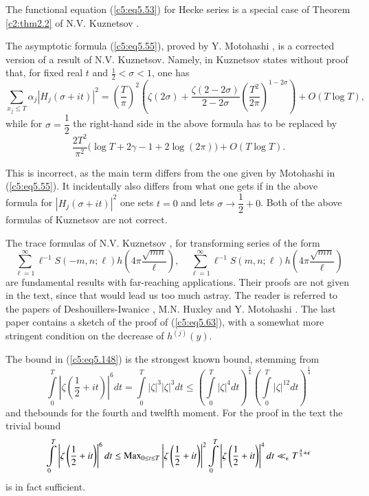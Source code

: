 The functional equation (\ref{c5:eq5.53}) for Hecke series is a
special case of Theorem \ref{c2:thm2.2} of N.V. Kuznetsov
\cite{Kuznetsov4}. 

The asymptotic formula (\ref{c5:eq5.55}), proved by Y. Motohashi
\cite{Motohashi7}, is a corrected version of a result of
N.V. Kuznetsov. Namely, in \cite{Kuznetsov4} Kuznetsov states without
proof that, for fixed real $t$ and $\frac{1}{2} < \sigma < 1$, one has 
$$ 
\sum\limits_{x_j \leq T} \alpha_j |H_j (\sigma + it)|^2 =
\left(\frac{T}{\pi} \right)^2 \left(\zeta(2\sigma) +
\frac{\zeta(2-2\sigma)}{2-2\sigma} \left(\frac{T^2}{2\pi}
\right)^{1-2\sigma}  \right) + O (T \log T), 
$$
while for $\sigma =\dfrac{1}{2}$ the right-hand side in the above
formula has to be replaced by 
$$
\frac{2T^2}{\pi^2} \big(\log T + 2 \gamma -1 + 2 \log (2\pi)\big) + O
(T \log T). 
$$

This is incorrect, as the main term differs from the one given by
Motohashi in (\ref{c5:eq5.55}). It incidentally also differs from what
one gets if in the above formula for $|H_j(\sigma + it)|^2$ one sets
$t =0$ and lets $\sigma \to \dfrac{1}{2} +0$. Both of the above
formulas of Kuznetsov are not correct. 

The trace formulas of N.V. Kuznetsov \cite{Kuznetsov2},
\cite{Kuznetsov3} for transforming series of the form  
$$
\sum\limits^\infty_{\ell=1} \ell^{-1} S (-m, n;\ell) h \left(4\pi
\frac{\sqrt{mn}}{\ell} \right),\quad \sum\limits^\infty_{\ell=1}
\ell^{-1} 
S (m,n;\ell) h  \left(4\pi\frac{\sqrt{mn}}{\ell} \right) 
$$
are fundamental results with far-reaching applications. Their proofs
are not given in the text, since that would lead us too much
astray. The reader is referred to the papers of Deshouillers-Iwanice
\cite{Deshouillers and Iwaniec1}, M.N. Huxley \cite{Huxley1} and
Y. Motohashi \cite{Motohashi6}. The last paper contains a sketch of
the proof of (\ref{c5:eq5.63}), with a somewhat more stringent
condition on the decrease of $h^{(j)} (y)$. 

The bound in (\ref{c5:eq5.148}) is the strongest known bound, stemming
from 
$$ 
\int\limits^T_0 \left|\zeta \left(\frac{1}{2} + it \right)\right|^6 dt
= \int\limits^T_0 |\zeta|^3 |\zeta|^3 dt \leq \left(\int\limits^T_0
|\zeta|^4 dt \right)^{\frac{3}{4}} \left(\int\limits^{T}_0
|\zeta|^{12} dt \right)^{\frac{1}{4}} 
$$
and the\pageoriginale bounds for the fourth and twelfth moment. For
the proof in the text the trivial bound 
$$ 
\int\limits^T_0 \left|\zeta \left(\frac{1}{2} + it \right)\right|^6 dt 
\leq \operatorname{Max}\limits_{0 \leq t \leq T} \left|\zeta \left(\frac{1}{2} + it
\right)\right|^2 \int\limits^T_0 \left|\zeta \left(\frac{1}{2} + it
\right)\right|^4 dt 
\ll_\epsilon T^{\frac{4}{3} + \epsilon}  
$$
is in fact sufficient.

